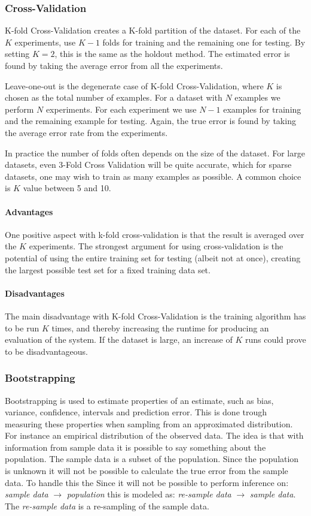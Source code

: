 \subsubsection{Cross-Validation}
K-fold Cross-Validation creates a K-fold partition of the dataset. For each of
the $K$ experiments, use $K-1$ folds for training and the remaining one for
testing. By setting $K=2$, this is the same as the holdout method. The estimated
error is found by taking the average error from all the experiments.

Leave-one-out is the degenerate case of K-fold Cross-Validation, where $K$ is
chosen as the total number of examples. For a dataset with $N$ examples we
perform $N$ experiments. For each experiment we use $N-1$ examples for training
and the remaining example for testing. Again, the true error is found by taking
the average error rate from the experiments.

In practice the number of folds often depends on the size of the dataset. For
large datasets, even 3-Fold Cross Validation will be quite accurate, which for
sparse datasets, one may wish to train as many examples as possible. A common
choice is $K$ value between 5 and 10.

\paragraph{Advantages}
One positive aspect with k-fold cross-validation is that the result is averaged over the $K$ experiments. The strongest argument for using cross-validation is the potential of using the entire training set for testing (albeit not at once), creating the largest possible test set for a fixed training data set.

\paragraph{Disadvantages}
The main disadvantage with K-fold Cross-Validation is the training algorithm has
to be run $K$ times, and thereby increasing the runtime for producing an
evaluation of the system. If the dataset is large, an increase of $K$ runs could
prove to be disadvantageous.

\subsubsection{Bootstrapping~\cite{efron1994introduction}}
Bootstrapping is used to estimate properties of an estimate, such as bias, variance, confidence, intervals and prediction error.
This is done trough measuring these properties when sampling from an approximated distribution.
For instance an empirical distribution of the observed data.
The idea is that with information from sample data it is possible to say something about the population.
The sample data is a subset of the population.
Since the population is unknown it will not be possible to calculate the true error from the sample data.
To handle this the
Since it will not be possible to perform inference on:
\emph{sample data} $\rightarrow$ \emph{population} this is modeled as:
\emph{re-sample data} $\rightarrow$ \emph{sample data}.
The \emph{re-sample data} is a re-sampling of the sample data.

